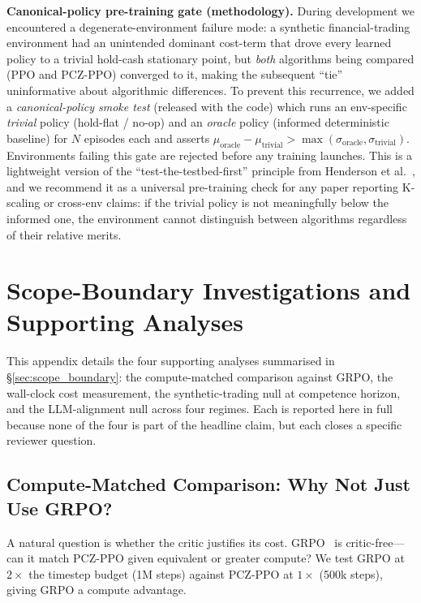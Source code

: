 \documentclass[11pt,a4paper]{article}
\begin{document}
\textbf{Canonical-policy pre-training gate (methodology).} During development we encountered a degenerate-environment failure mode: a synthetic financial-trading environment had an unintended dominant cost-term that drove every learned policy to a trivial hold-cash stationary point, but \emph{both} algorithms being compared (PPO and PCZ-PPO) converged to it, making the subsequent ``tie'' uninformative about algorithmic differences. To prevent this recurrence, we added a \emph{canonical-policy smoke test} (released with the code) which runs an env-specific \emph{trivial} policy (hold-flat / no-op) and an \emph{oracle} policy (informed deterministic baseline) for $N$ episodes each and asserts $\mu_{\text{oracle}} - \mu_{\text{trivial}} > \max(\sigma_{\text{oracle}}, \sigma_{\text{trivial}})$. Environments failing this gate are rejected before any training launches. This is a lightweight version of the ``test-the-testbed-first'' principle from Henderson et al.~\cite{henderson2018deeprl}, and we recommend it as a universal pre-training check for any paper reporting K-scaling or cross-env claims: if the trivial policy is not meaningfully below the informed one, the environment cannot distinguish between algorithms regardless of their relative merits.

\section{Scope-Boundary Investigations and Supporting Analyses}
\label{app:scope_boundary}

This appendix details the four supporting analyses summarised in §\ref{sec:scope_boundary}: the compute-matched comparison against GRPO, the wall-clock cost measurement, the synthetic-trading null at competence horizon, and the LLM-alignment null across four regimes. Each is reported here in full because none of the four is part of the headline claim, but each closes a specific reviewer question.

\subsection{Compute-Matched Comparison: Why Not Just Use GRPO?}
\label{app:gym_grpo_compute_matched}
\label{sec:compute_matched}

A natural question is whether the critic justifies its cost. GRPO~\cite{shao2024grpo} is critic-free---can it match PCZ-PPO given equivalent or greater compute? We test GRPO at $2\times$ the timestep budget (1M steps) against PCZ-PPO at $1\times$ (500k steps), giving GRPO a compute advantage.
\end{document}
